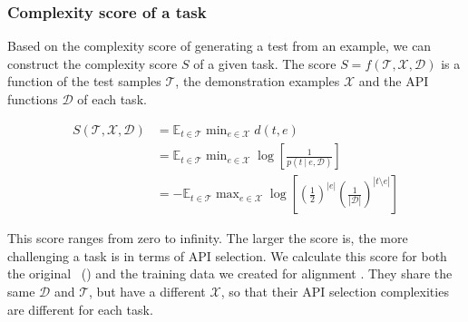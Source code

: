 \subsubsection{Complexity score of a task}
\label{sec:complexity}
Based on the complexity score of generating a test from an example, we can construct the complexity score $S$ of a given task. The score $S = f(\mathcal{T}, \mathcal{X}, \mathcal{D})$ is a function of the test samples $\mathcal{T}$, the demonstration examples $\mathcal{X}$ and the API functions $\mathcal{D}$ of each task. 


\begin{equation}
\begin{aligned}
    S(\mathcal{T}, \mathcal{X}, \mathcal{D}) &= \mathbb{E}_{t \in \mathcal{T}}\min\nolimits_{e \in \mathcal{X}} d(t, e) \\
    &= \mathbb{E}_{t \in \mathcal{T}}\min\nolimits_{e \in \mathcal{X}}\log\left[\frac{1}{p(t~|~e, \mathcal{D})}\right]  \\
    &= - \mathbb{E}_{t \in \mathcal{T}}\max\nolimits_{e \in \mathcal{X}}\log\left[\left(\frac{1}{2}\right)^{|e|} \left(\frac{1}{|\mathcal{D}|}\right)^{|t \setminus e|}\right]
\end{aligned}
\end{equation}

This score ranges from zero to infinity. The larger the score is, the more challenging a task is in terms of API selection. We calculate this score for both the original \snact~() and the training data we created for alignment . They share the same $\mathcal{D}$ and $\mathcal{T}$, but have a different $\mathcal{X}$, so that their API selection complexities are different for each task.




